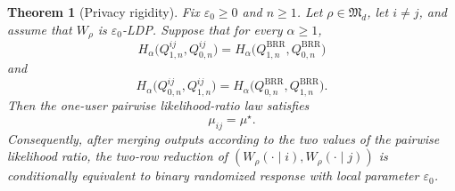 \documentclass[11pt]{amsart}
\newtheorem{theorem}{Theorem}[section]
\theoremstyle{definition}
\newcommand{\fM}{\mathfrak M}
\begin{document}
\begin{theorem}[Privacy rigidity]\label{thm:privacy-rigidity}
Fix $\varepsilon_0\ge 0$ and $n\ge 1$. Let $\rho\in\fM_d$, let $i\neq j$, and assume that $W_\rho$ is $\varepsilon_0$-LDP. Suppose that for every $\alpha\ge 1$,
\[
H_\alpha\bigl(Q_{1,n}^{ij},Q_{0,n}^{ij}\bigr)
=
H_\alpha\bigl(Q_{1,n}^{\mathrm{BRR}},Q_{0,n}^{\mathrm{BRR}}\bigr)
\]
and
\[
H_\alpha\bigl(Q_{0,n}^{ij},Q_{1,n}^{ij}\bigr)
=
H_\alpha\bigl(Q_{0,n}^{\mathrm{BRR}},Q_{1,n}^{\mathrm{BRR}}\bigr).
\]
Then the one-user pairwise likelihood-ratio law satisfies
\[
\mu_{ij}=\mu^\star.
\]
Consequently, after merging outputs according to the two values of the pairwise likelihood ratio, the two-row reduction of $(W_\rho(\cdot\mid i),W_\rho(\cdot\mid j))$ is conditionally equivalent to binary randomized response with local parameter $\varepsilon_0$.
\end{theorem}
\end{document}
